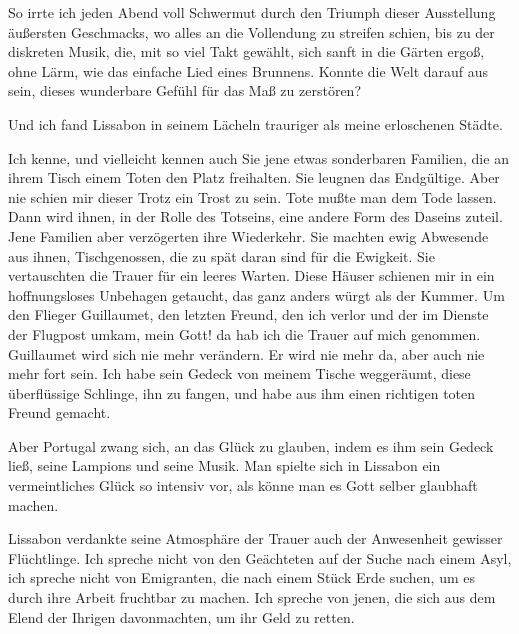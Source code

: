 \documentclass[12pt,ngerman,twocolumn]{article}
\begin{document}
So irrte ich jeden Abend voll Schwermut durch den Triumph dieser Ausstellung äußersten Geschmacks, wo alles an die Vollendung zu streifen schien, bis zu der diskreten Musik, die, mit so viel Takt gewählt, sich sanft in die Gärten ergoß, ohne Lärm, wie das einfache Lied eines Brunnens. Konnte die Welt darauf aus sein, dieses wunderbare Gefühl für das Maß zu zerstören?

Und ich fand Lissabon in seinem Lächeln trauriger als meine erloschenen Städte.

Ich kenne, und vielleicht kennen auch Sie jene etwas sonderbaren Familien, die an ihrem Tisch einem Toten den Platz freihalten. Sie leugnen das Endgültige. Aber nie schien mir dieser Trotz ein Trost zu sein. Tote mußte man dem Tode lassen. Dann wird ihnen, in der Rolle des Totseins, eine andere Form des Daseins zuteil. Jene Familien aber verzögerten ihre Wiederkehr. Sie machten ewig Abwesende aus ihnen, Tischgenossen, die zu spät daran sind für die Ewigkeit. Sie vertauschten die Trauer für ein leeres Warten. Diese Häuser schienen mir in ein hoffnungsloses Unbehagen getaucht, das ganz anders würgt als der Kummer. Um den Flieger Guillaumet, den letzten Freund, den ich verlor und der im Dienste der Flugpost umkam, mein Gott! da hab ich die Trauer auf mich genommen. Guillaumet wird sich nie mehr verändern. Er wird nie mehr da, aber auch nie mehr fort sein. Ich habe sein Gedeck von meinem Tische weggeräumt, diese überflüssige Schlinge, ihn zu fangen, und habe aus ihm einen richtigen toten Freund gemacht.

Aber Portugal zwang sich, an das Glück zu glauben, indem es ihm sein Gedeck ließ, seine Lampions und seine Musik. Man spielte sich in Lissabon ein vermeintliches Glück so intensiv vor, als könne man es Gott selber glaubhaft machen.

Lissabon verdankte seine Atmosphäre der Trauer auch der Anwesenheit gewisser Flüchtlinge. Ich spreche nicht von den Geächteten auf der Suche nach einem Asyl, ich spreche nicht von Emigranten, die nach einem Stück Erde suchen, um es durch ihre Arbeit fruchtbar zu machen. Ich spreche von jenen, die sich aus dem Elend der Ihrigen davonmachten, um ihr Geld zu retten.
\end{document}
